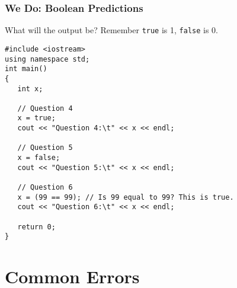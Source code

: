 \documentclass{beamer}
\begin{document}
\begin{frame}[fragile]
\frametitle{We Do: Boolean Predictions}
What will the output be? Remember \texttt{true} is 1, \texttt{false} is 0.
\begin{verbatim}
#include <iostream>
using namespace std;
int main()
{
   int x;

   // Question 4
   x = true;
   cout << "Question 4:\t" << x << endl;

   // Question 5
   x = false;
   cout << "Question 5:\t" << x << endl;

   // Question 6
   x = (99 == 99); // Is 99 equal to 99? This is true.
   cout << "Question 6:\t" << x << endl;

   return 0;
}
\end{verbatim}
\end{frame}

\section{Common Errors}
\end{document}
